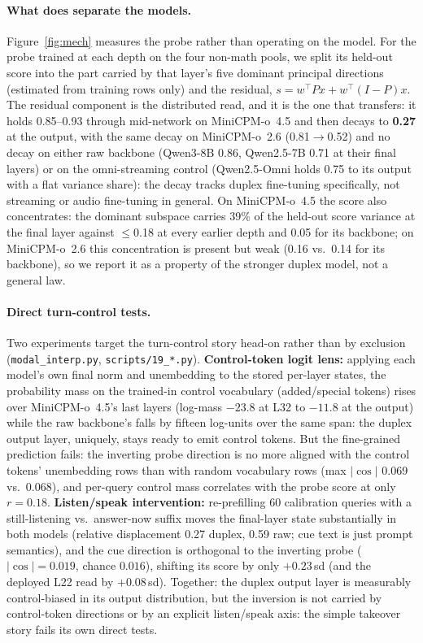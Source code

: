 \paragraph{What does separate the models.} Figure~\ref{fig:mech}
measures the probe rather than operating on the model. For the probe
trained at each depth on the four non-math pools, we split its
held-out score into the part carried by that layer's five dominant
principal directions (estimated from training rows only) and the
residual, $s = w^\top P x + w^\top (I-P) x$. The residual component is
the distributed read, and it is the one that transfers: it holds
0.85--0.93 through mid-network on MiniCPM-o~4.5 and then decays to
\textbf{0.27} at the output, with the same decay on MiniCPM-o~2.6
(0.81$\to$0.52) and no decay on either raw backbone (Qwen3-8B
0.86, Qwen2.5-7B 0.71 at their final layers) or on the omni-streaming
control (Qwen2.5-Omni holds 0.75 to its output with a flat variance
share): the decay tracks duplex fine-tuning specifically, not
streaming or audio fine-tuning in general. On MiniCPM-o~4.5 the
score also concentrates: the dominant subspace carries 39\% of the
held-out score variance at the final layer against $\le$0.18 at every
earlier depth and 0.05 for its backbone; on MiniCPM-o~2.6 this
concentration is present but weak (0.16 vs.\ 0.14 for its backbone),
so we report it as a property of the stronger duplex model, not a
general law.

\paragraph{Direct turn-control tests.} Two experiments target the
turn-control story head-on rather than by exclusion
(\texttt{modal\_interp.py}, \texttt{scripts/19\_*.py}). \textbf{Control-token
logit lens:} applying each model's own final norm and unembedding to
the stored per-layer states, the probability mass on the trained-in
control vocabulary (added/special tokens) rises over
MiniCPM-o~4.5's last layers (log-mass $-23.8$ at L32 to $-11.8$ at the
output) while the raw backbone's falls by fifteen log-units over the
same span: the duplex output layer, uniquely, stays ready to emit
control tokens. But the fine-grained prediction fails: the inverting
probe direction is no more aligned with the control tokens' unembedding
rows than with random vocabulary rows (max $|\cos|$ 0.069 vs.\ 0.068),
and per-query control mass correlates with the probe score at only
$r{=}0.18$. \textbf{Listen/speak intervention:} re-prefilling 60
calibration queries with a still-listening vs.\ answer-now suffix moves
the final-layer state substantially in both models (relative
displacement 0.27 duplex, 0.59 raw; cue text is just prompt
semantics), and the cue direction is orthogonal to the inverting probe
($|\cos|{=}0.019$, chance $0.016$), shifting its score by only
$+0.23$\,sd (and the deployed L22 read by $+0.08$\,sd). Together: the
duplex output layer is measurably control-biased in its output
distribution, but the inversion is not carried by control-token
directions or by an explicit listen/speak axis: the simple
takeover story fails its own direct tests.

